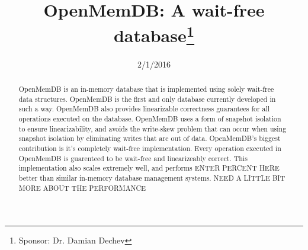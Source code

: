 \documentclass[conference, compsoc]{IEEEtran}
\begin{document}
\title{OpenMemDB: A wait-free database\thanks{Sponsor: Dr. Damian Dechev}}
\author{
 \and 
{} \and 
{} \and 
{}
}

\date{2/1/2016}

\maketitle
\newpage

\begin{abstract}
OpenMemDB is an in-memory database that is implemented using solely wait-free
data structures. OpenMemDB is the first and only database currently developed in such a
way. OpenMemDB also provides linearizable correctness guarantees for all operations
executed on the database. OpenMemDB uses a form of snapshot isolation to ensure 
linearizability, and avoids the write-skew problem that can occur when using
snapshot isolation by eliminating writes that are out of data. 
OpenMemDB's biggest contribution is it's completely wait-free 
implementation. Every operation executed in OpenMemDB is guarenteed to be wait-free 
and linearizeably correct. This implementation also scales extremely well, and performs 
{{ENTER PERCENT HERE}} better than similar in-memory database management systems.
{{NEED A LITTLE BIT MORE ABOUT THE PERFORMANCE}}
\end{abstract}
\end{document}
